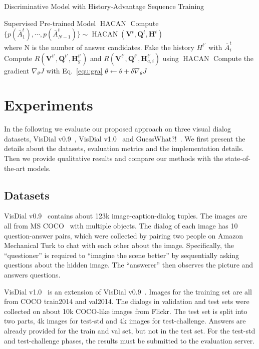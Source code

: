 \documentclass[10pt,twocolumn,letterpaper]{article}
\DeclareMathOperator{\HACAN}{HACAN}
\begin{document}
\begin{algorithm}
\caption{Discriminative Model with History-Advantage Sequence Training} 
\label{alg1}
\begin{algorithmic}[1]
\REQUIRE Supervised Pre-trained Model $\HACAN$
    \STATE Compute $\{ p(\bar{A}^t_{1}),\cdots,p(\bar{A}^t_{N-1})\} \sim \HACAN(\bm{V}^t, \bm{Q}^t, \bm{H}^t)$\\
    where N is the number of answer candidates.
            \STATE Fake the history $H^{t'}$ with $\bar{A}^{t}_{i}$
            \STATE Compute $R(\bm{V}^{t'},\bm{Q}^{t'},\bm{H}^{t'}_{g})$ and $R(\bm{V}^{t'}, \bm{Q}^{t'}, \bm{H}^{t'}_{a,i})$ 
            using $\HACAN$
\ENDFOR
    \ENDFOR
    \STATE Compute the gradient $\nabla_{\theta} J$ with Eq.~\eqref{equ:gra}
    \STATE $\theta \leftarrow \theta + \delta\nabla_{\theta}J$
\ENDFOR
\end{algorithmic}
\end{algorithm}

\section{Experiments}\label{sec:5}
In the following we evaluate our proposed approach on three visual dialog datasets, VisDial v0.9~\cite{das2017visual}, VisDial v1.0~\cite{das2017visual} and GuessWhat?!~\cite{de2017guesswhat}. We first present the details about the datasets, evaluation metrics and the implementation details. Then we provide qualitative results and compare our methods with the state-of-the-art models.
\subsection{Datasets}
VisDial v0.9~\cite{das2017visual} contains about 123k image-caption-dialog
tuples. The images are all from MS COCO~\cite{lin2014microsoft} with multiple objects. The dialog of each image has 10 question-answer pairs, which were collected by pairing two people on Amazon Mechanical Turk to chat with each other about the image. Specifically, the ``questioner'' is required to ``imagine the scene better'' by sequentially asking questions about the hidden image. The ``answerer'' then observes the picture and answers questions. 


VisDial v1.0~\cite{das2017visual} is an extension of VisDial v0.9~\cite{das2017visual}. Images for the training set are all from COCO train2014 and val2014. The dialogs in validation and test sets were collected on about 10k COCO-like images from Flickr. The test set is split into two parts, 4k images for test-std and 4k images for test-challenge. Answers are already provided for the train and val set, but not in the test set. For the test-std and test-challenge phases, the results must be submitted to the evaluation server. 
\end{document}
